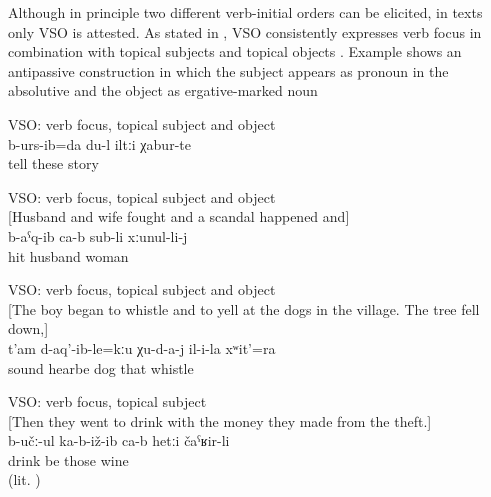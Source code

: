 Although in principle two different verb-initial orders can be elicited, in texts only VSO is attested. As stated in \citet{Forker.Belyaev2016}, VSO consistently expresses verb focus in combination with topical subjects and topical objects . Example  shows an antipassive construction in which the subject appears as pronoun in the absolutive and the object as ergative-marked noun 
%
\begin{exe}
	\ex	VSO: verb focus, topical subject and object\\	\label{ex:‎I already told these stories VSO}
	\gll	b-urs-ib=da	du-l	iltːi	χabur-te\\
		tell		these	story\\
	\glt	{}

	\ex	VSO: verb focus, topical subject and object\\\label{ex:‎‎The husband hit the wife VSO}%
		[Husband and wife fought and a scandal happened and]\\
	\gll	b-aˁq-ib	ca-b	sub-li	xːunul-li-j\\
		hit		husband	woman\\
	\glt	{}

	\ex	VSO: verb focus, topical subject and object\\\label{ex:and the dogs didn't hear his sound or whistling VSO}%
		[The boy began to whistle and to yell at the dogs in the village. The tree fell down,]\\
	\gll	t'am	d-aq'-ib-le=kːu	χu-d-a-j	il-i-la	xʷit'=ra\\
		sound	hearbe	dog	that	whistle\\
	\glt	{}

	\ex	VSO: verb focus, topical subject\\\label{ex:They sit and drink wine.IS}%
		[Then they went to drink with the money they made from the theft.]\\
	\gll	b-učː-ul	ka-b-iž-ib	ca-b	hetːi	čaˁʁir-li\\
		drink	be		those	wine\\
	\glt	{} (lit. )
\end{exe}

